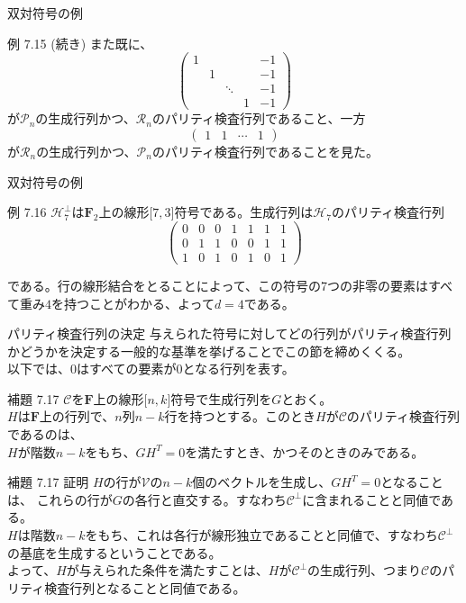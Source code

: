 \documentclass[dvipdfmx,10pt,jsarticle]{beamer}
\begin{document}
  \begin{frame}{双対符号の例}
    \begin{block}{例 7.15 (続き)}
      また既に、
      \[\begin{pmatrix}
          1 &   &   &  & -1 \\
            & 1 &   &  & -1 \\
            &   & \ddots &  & -1 \\
            &   &   & 1 & -1
      \end{pmatrix} \]
      が$\mathcal{P}_n$の生成行列かつ、$\mathcal{R}_n$のパリティ検査行列であること、一方
      \[\begin{pmatrix}
          1 & 1 & \cdots & 1
      \end{pmatrix} \]
      が$\mathcal{R}_n$の生成行列かつ、$\mathcal{P}_n$のパリティ検査行列であることを見た。
    \end{block}
  \end{frame}
  \begin{frame}{双対符号の例}
    \begin{block}{例 7.16}
      $\mathcal{H}_7^\perp$は$\mathbf{F}_2$上の線形$\lbrack7,3\rbrack$符号である。生成行列は$\mathcal{H}_7$のパリティ検査行列
      \[\begin{pmatrix}
          0 & 0 & 0 & 1 & 1 & 1 & 1 \\
          0 & 1 & 1 & 0 & 0 & 1 & 1 \\
          1 & 0 & 1 & 0 & 1 & 0 & 1 
        \end{pmatrix} \]
    \end{block}
    である。行の線形結合をとることによって、この符号の7つの非零の要素はすべて重み$4$を持つことがわかる、よって$d=4$である。
  \end{frame}

  \begin{frame}{パリティ検査行列の決定}
    与えられた符号に対してどの行列がパリティ検査行列かどうかを決定する一般的な基準を挙げることでこの節を締めくくる。\\
    以下では、$0$はすべての要素が$0$となる行列を表す。
    \begin{block}{補題 7.17}
      $\mathcal{C}$を$\mathbf{F}$上の線形$\lbrack n,k\rbrack$符号で生成行列を$G$とおく。\\
      $H$は$\mathbf{F}$上の行列で、$n$列$n-k$行を持つとする。このとき$H$が$\mathcal{C}$のパリティ検査行列であるのは、\\
      $H$が階数$n-k$をもち、$GH^T = 0$を満たすとき、かつそのときのみである。
    \end{block}
  \end{frame}
  \begin{frame}{補題 7.17 証明}
    $H$の行が$\mathcal{V}$の$n-k$個のベクトルを生成し、$GH^T = 0$となることは、
    これらの行が$G$の各行と直交する。すなわち$\mathcal{C}^\perp$に含まれることと同値である。\\
    $H$は階数$n-k$をもち、これは各行が線形独立であることと同値で、すなわち$\mathcal{C}^\perp$の基底を生成するということである。\\
    よって、$H$が与えられた条件を満たすことは、$H$が$\mathcal{C}^\perp$の生成行列、つまり$\mathcal{C}$のパリティ検査行列となることと同値である。
  \end{frame}
\end{document}
